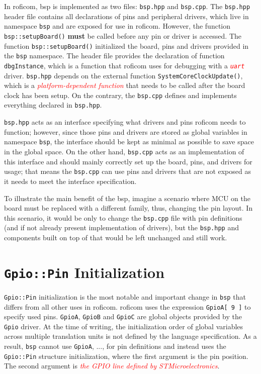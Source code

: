 \documentclass[
  digital,     %
  oneside,     %
  nosansbold,  %
  nocolorbold, %
  nolof,         %
  nolot,         %
]{fithesis4}
\newcommand{\TODO}[1]{\textcolor{red}{\textit{#1}}}
\begin{document}
{{{In \acrshort{roficom}, \acrshort{bsp} is implemented as two files: \verb|bsp.hpp| and \verb|bsp.cpp|. The \verb|bsp.hpp| header file contains all declarations of pins and peripheral drivers, which live in namespace \lstinline{bsp} and are exposed for use in \acrshort{roficom}. However, the function \lstinline{bsp::setupBoard()} \textbf{must} be called before any pin or driver is accessed. The function \lstinline{bsp::setupBoard()} initialized the board, pins and drivers provided in the \lstinline{bsp} namespace. The header file provides the declaration of function \lstinline{dbgInstance}, which is a function that \acrshort{roficom} uses for debugging with a \TODO{ \texttt{uart} } driver. \verb|bsp.hpp| depends on the external function \lstinline|SystemCoreClockUpdate()|, which is a \TODO{platform-dependent function} that needs to be called after the board clock has been setup. On the contrary, the \verb|bsp.cpp| defines and implements everything declared in \verb|bsp.hpp|. 

\verb|bsp.hpp| acts as an interface specifying what drivers and pins \acrshort{roficom} needs to function; however, since those pins and drivers are stored as global variables in namespace \lstinline{bsp}, the interface should be kept as minimal as possible to save space in the global space. On the other hand, \verb|bsp.cpp| acts as an implementation of this interface and should mainly correctly set up the board, pins, and drivers for usage; that means the \verb|bsp.cpp| can use pins and drivers that are not exposed as it needs to meet the interface specification.

To illustrate the main benefit of the \acrshort{bsp}, imagine a scenario where MCU on the board must be replaced with a different family, thus, changing the pin layout. In this scenario, it would be only to change the \verb|bsp.cpp| file with pin definitions (and if not already present implementation of drivers), but the \verb|bsp.hpp| and components built on top of that would be left unchanged and still work.

\section[ Gpio::Pin Initialization ]{ \lstinline|Gpio::Pin| Initialization }
\lstinline{Gpio::Pin} initialization is the most notable and important change in \lstinline{bsp} that differs from all other uses in \acrshort{roficom}. \acrshort{roficom} uses the expression \lstinline{GpioA[ 9 ]} to specify used pins. \lstinline{GpioA}, \lstinline{GpioB} and \lstinline{GpioC} are global objects provided by the \lstinline{Gpio} driver. At the time of writing, the initialization order of global variables across multiple translation units is not defined by the language specification. As a result, \lstinline{bsp} cannot use \lstinline{GpioA}, ..., for pin definitions and instead uses the \lstinline{Gpio::Pin} structure initialization, where the first argument is the pin position. The second argument is \TODO{the GPIO line defined by STMicroelectronics}.

}}}
\end{document}
